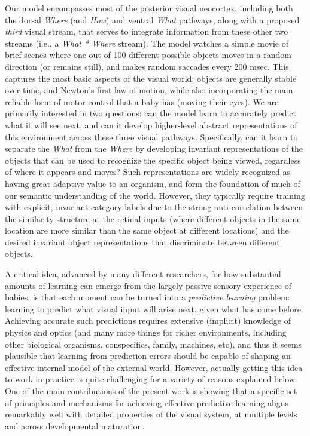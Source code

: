 \documentclass[11pt,twoside]{article}
\newif\myifpdf
\begin{document}
Our model encompasses most of the posterior visual neocortex, including both the dorsal {\em Where} (and {\em How}) and ventral {\em What} pathways, along with a proposed {\em third} visual stream, that serves to integrate information from these other two streams (i.e., a {\em What * Where} stream).  The model watches a simple movie of brief scenes where one out of 100 different possible objects moves in a random direction (or remains still), and makes random saccades every 200 msec.  This captures the most basic aspects of the visual world: objects are generally stable over time, and Newton's first law of motion, while also incorporating the main reliable form of motor control that a baby has (moving their eyes).  We are primarily interested in two questions: can the model learn to accurately predict what it will see next, and can it develop higher-level abstract representations of this environment across these three visual pathways.  Specifically, can it learn to separate the {\em What} from the {\em Where} by developing invariant representations of the objects that can be used to recognize the specific object being viewed, regardless of where it appears and moves?  Such representations are widely recognized as having great adaptive value to an organism, and form the foundation of much of our semantic understanding of the world.  However, they typically require training with explicit, invariant category labels due to the strong anti-correlation between the similarity structure at the retinal inputs (where different objects in the same location are more similar than the same object at different locations) and the desired invariant object representations that discriminate between different objects.

A critical idea, advanced by many different researchers, for how substantial amounts of learning can emerge from the largely passive sensory experience of babies, is that each moment can be turned into a {\em predictive learning} problem: learning to predict what visual input will arise next, given what has come before.  Achieving accurate such predictions requires extensive (implicit) knowledge of physics and optics (and many more things for richer environments, including other biological organisms, conspecifics, family, machines, etc), and thus it seems plausible that learning from prediction errors should be capable of shaping an effective internal model of the external world.  However, actually getting this idea to work in practice is quite challenging for a variety of reasons explained below.  One of the main contributions of the present work is showing that a specific set of principles and mechanisms for achieving effective predictive learning aligns remarkably well with detailed properties of the visual system, at multiple levels and across developmental maturation.
\end{document}
